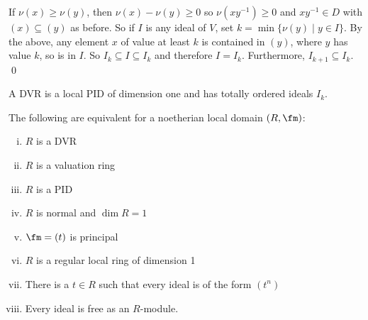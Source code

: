If $\nu(x) \geq \nu(y)$, then $\nu(x)-\nu(y) \geq 0$ so $\nu(xy^{-1}) \geq 0$ and $xy^{-1} \in D$ with $(x) \subseteq (y)$ as before. So if $I$ is any ideal of $V$, set $k=\min\{\nu(y) \;|\; y \in I\}$. By the above, any element $x$ of value at least $k$ is contained in $(y)$, where $y$ has value $k$, so is in $I$. So $I_k \subseteq I \subseteq I_k$ and therefore $I=I_k$. Furthermore, $I_{k+1} \subseteq I_k$. \qed \\

\begin{cor}
A DVR is a local PID of dimension one and has totally ordered ideals $I_k$. 
\end{cor}

\begin{thmm}
The following are equivalent for a noetherian local domain $(R,\fm)$:
\begin{enumerate}[(i)]
\item $R$ is a DVR
\item $R$ is a valuation ring
\item $R$ is a PID
\item $R$ is normal and $\dim R=1$
\item $\fm=(t)$ is principal
\item $R$ is a regular local ring of dimension 1
\item There is a $t \in R$ such that every ideal is of the form $(t^n)$
\item Every ideal is free as an $R$-module.
\end{enumerate}
\end{thmm}

